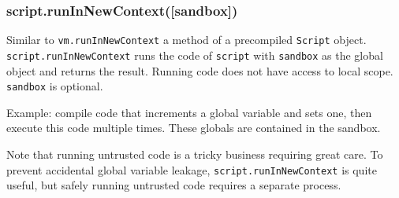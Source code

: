 \begin{Shaded}
\begin{Highlighting}[]
 \NormalTok{);}

\NormalTok{;}

 \NormalTok{(}\NormalTok{, }\NormalTok{);}

 \NormalTok{(}  \NormalTok{) \{}
  \NormalTok{();}
\NormalTok{\}}


\end{Highlighting}
\end{Shaded}

\subsubsection{script.runInNewContext({[}sandbox{]})}

Similar to \texttt{vm.runInNewContext} a method of a precompiled
\texttt{Script} object. \texttt{script.runInNewContext} runs the code of
\texttt{script} with \texttt{sandbox} as the global object and returns
the result. Running code does not have access to local scope.
\texttt{sandbox} is optional.

Example: compile code that increments a global variable and sets one,
then execute this code multiple times. These globals are contained in
the sandbox.

\begin{Shaded}
\begin{Highlighting}[]
 \NormalTok{),}
    \NormalTok{),}
      \NormalTok{: }\NormalTok{,}
      \NormalTok{: }
    \NormalTok{\};}

 \NormalTok{(}\NormalTok{, }\NormalTok{);}

 \NormalTok{(}  \NormalTok{) \{}
\NormalTok{\}}

\NormalTok{(}

\end{Highlighting}
\end{Shaded}

Note that running untrusted code is a tricky business requiring great
care. To prevent accidental global variable leakage,
\texttt{script.runInNewContext} is quite useful, but safely running
untrusted code requires a separate process.
